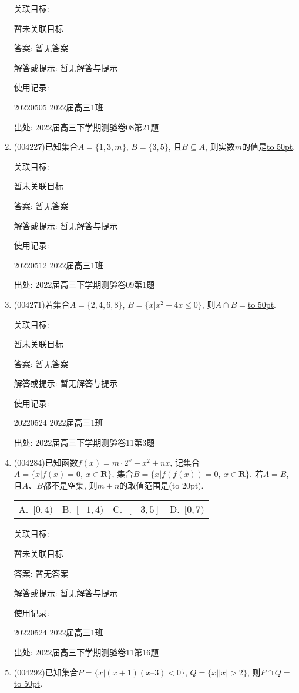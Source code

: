 \documentclass[10pt,a4paper]{article}
\newcommand{\blank}[1]{\underline{\hbox to #1pt{}}}
\newcommand{\bracket}[1]{(\hbox to #1pt{})}
\newcommand{\fourch}[4]{\par\begin{tabular}{p{.23\textwidth}p{.23\textwidth}p{.23\textwidth}p{.23\textwidth}}
A.~#1 &B.~#2& C.~#3& D.~#4
\end{tabular}}
\begin{document}
\begin{enumerate}[1.]
关联目标:

暂未关联目标

答案: 暂无答案

解答或提示: 暂无解答与提示

使用记录:

20220505	2022届高三1班			


出处: 2022届高三下学期测验卷08第21题
\item { (004227)}已知集合$A=\{1,3,m\}$, $B=\{3,5\}$, 且$B\subseteq A$, 则实数$m$的值是\blank{50}.


关联目标:

暂未关联目标

答案: 暂无答案

解答或提示: 暂无解答与提示

使用记录:

20220512	2022届高三1班	


出处: 2022届高三下学期测验卷09第1题
\item { (004271)}若集合$A=\{2,4,6,8\}$, $B=\{x|x^2-4x\le 0\}$, 则$A\cap B=$\blank{50}.


关联目标:

暂未关联目标

答案: 暂无答案

解答或提示: 暂无解答与提示

使用记录:

20220524	2022届高三1班	


出处: 2022届高三下学期测验卷11第3题
\item { (004284)}已知函数$f(x)=m\cdot 2^x+x^2+nx$, 记集合$A=\{x|f(x)=0, \ x\in \mathbf{R}\}$, 集合$B=\{x|f(f(x))=0, \ x\in \mathbf{R}\}$.
若$A=B$, 且$A$、$B$都不是空集, 则$m+n$的取值范围是\bracket{20}.
\fourch{$[0,4)$}{$[-1,4)$}{$[-3,5]$}{$[0,7)$}


关联目标:

暂未关联目标

答案: 暂无答案

解答或提示: 暂无解答与提示

使用记录:

20220524	2022届高三1班	


出处: 2022届高三下学期测验卷11第16题
\item { (004292)}已知集合$P=\{x|(x+1)(x–3)<0\}$, $Q=\{x||x|>2\}$, 则$P\cap Q=$\blank{50}.



\end{enumerate}
\end{document}
